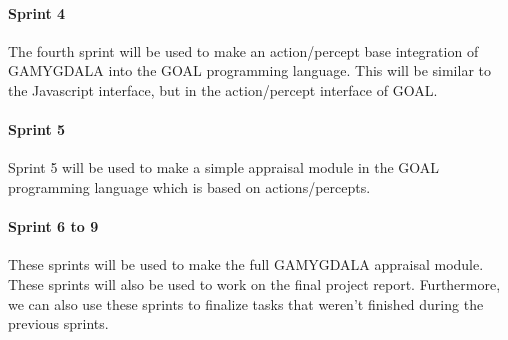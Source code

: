 \paragraph{Sprint 4} The fourth sprint will be used to make an action/percept base integration of GAMYGDALA into the GOAL programming language. This will be similar to the Javascript interface, but in the action/percept interface of GOAL.
\paragraph{Sprint 5} Sprint 5 will be used to make a simple appraisal module in the GOAL programming language which is based on actions/percepts.
\paragraph{Sprint 6 to 9} These sprints will be used to make the full GAMYGDALA appraisal module. These sprints will also be used to work on the final project report. Furthermore, we can also use these sprints to finalize tasks that weren't finished during the previous sprints.